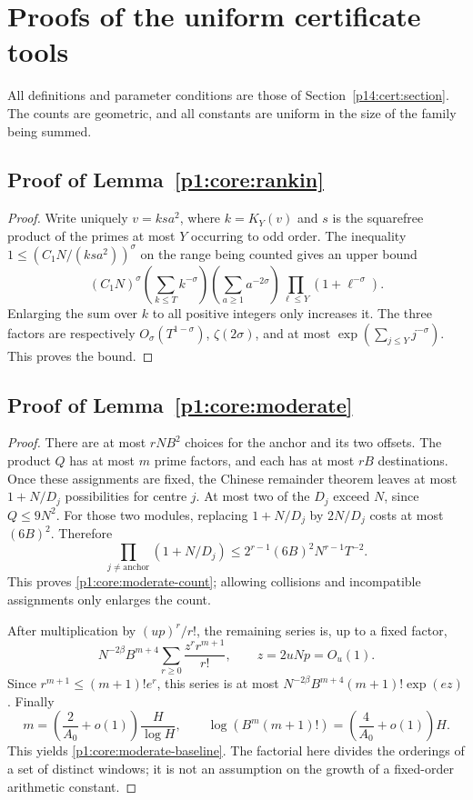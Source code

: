 \section{Proofs of the uniform certificate tools}
\label{p14:comp:certificate-tools}

All definitions and parameter conditions are those of
Section~\ref{p14:cert:section}. The counts are geometric, and all
constants are uniform in the size of the family being summed.

\subsection{Proof of Lemma~\ref{p1:core:rankin}}
\label{p14:comp:certificate-rankin}

\begin{proof}
Write uniquely $v=k s a^2$, where $k=K_Y(v)$ and $s$ is the
squarefree product of the primes at most $Y$ occurring to odd order.
The inequality $1\le (C_1N/(ksa^2))^\sigma$ on the range being
counted gives an upper bound
\[
 (C_1N)^\sigma
 \left(\sum_{k\le T}k^{-\sigma}\right)
 \left(\sum_{a\ge1}a^{-2\sigma}\right)
 \prod_{\ell\le Y}(1+\ell^{-\sigma}).
\]
Enlarging the sum over $k$ to all positive integers only increases it.
The three factors are respectively $O_\sigma(T^{1-\sigma})$,
$\zeta(2\sigma)$, and at most
$\exp(\sum_{j\le Y}j^{-\sigma})$. This proves the bound.
\end{proof}

\subsection{Proof of Lemma~\ref{p1:core:moderate}}
\label{p14:comp:certificate-moderate}

\begin{proof}
There are at most $rNB^2$ choices for the anchor and its two offsets.
The product $Q$ has at most $m$ prime factors, and each has at most
$rB$ destinations. Once these assignments are fixed, the Chinese
remainder theorem leaves at most $1+N/D_j$ possibilities for centre
$j$. At most two of the $D_j$ exceed $N$, since $Q\le9N^2$.
For those two modules, replacing $1+N/D_j$ by $2N/D_j$ costs at most
$(6B)^2$. Therefore
\[
 \prod_{j\ne\mathrm{anchor}}(1+N/D_j)
 \le 2^{r-1}(6B)^2N^{r-1}T^{-2}.
\]
This proves \eqref{p1:core:moderate-count}; allowing collisions and
incompatible assignments only enlarges the count.

After multiplication by $(up)^r/r!$, the remaining series is, up to
a fixed factor,
\[
 N^{-2\beta}B^{m+4}\sum_{r\ge0}\frac{z^r r^{m+1}}{r!},
 \qquad z=2uNp=O_u(1).
\]
Since $r^{m+1}\le(m+1)!e^r$, this series is at most
$N^{-2\beta}B^{m+4}(m+1)!\exp(ez)$. Finally
\[
 m=\left(\frac2{A_0}+o(1)\right)\frac{H}{\log H},\qquad
 \log(B^m(m+1)!)=\left(\frac4{A_0}+o(1)\right)H.
\]
This yields \eqref{p1:core:moderate-baseline}. The factorial here
divides the orderings of a set of distinct windows; it is not an
assumption on the growth of a fixed-order arithmetic constant.
\end{proof}

